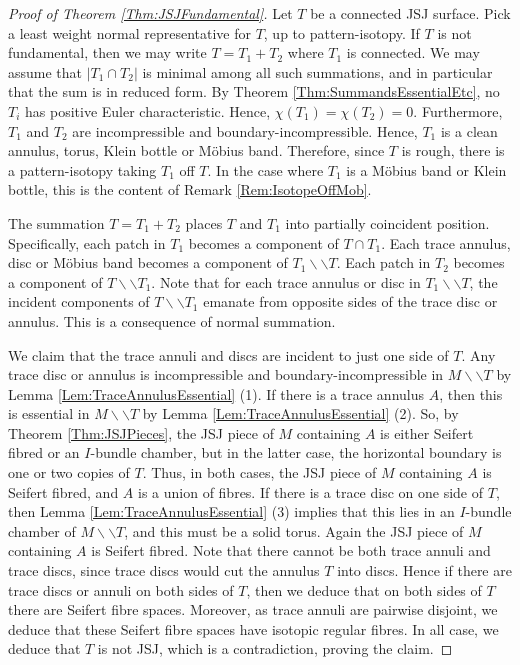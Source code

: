 \documentclass[oneside]{amsart}
\numberwithin{equation}{section}
\theoremstyle{plain}
\theoremstyle{definition}
\newcommand{\cut}{\backslash\backslash}
\begin{document}
\begin{proof}[Proof of Theorem \ref{Thm:JSJFundamental}]
Let $T$ be a connected JSJ surface. Pick a least weight normal representative for $T$, up to pattern-isotopy. If $T$ is not fundamental, then we may write $T = T_1 + T_2$ where $T_1$ is connected. We may assume that $|T_1 \cap T_2|$ is minimal among all such summations, and in particular that the sum is in reduced form.
By Theorem \ref{Thm:SummandsEssentialEtc}, no $T_i$ has positive Euler characteristic. Hence, $\chi(T_1) = \chi(T_2) = 0$. Furthermore, $T_1$ and $T_2$ are incompressible and boundary-incompressible. Hence, $T_1$ is a clean annulus, torus, Klein bottle or M\"obius band. Therefore, since $T$ is rough, there is a pattern-isotopy taking $T_1$ off $T$. In the case where $T_1$ is a M\"obius band or Klein bottle, this is the content of Remark \ref{Rem:IsotopeOffMob}.

The summation $T = T_1 + T_2$ places $T$ and $T_1$ into partially coincident position. Specifically, each patch in $T_1$ becomes a component of $T \cap T_1$. Each trace annulus, disc or M\"obius band becomes a component of $T_1 \cut T$. Each patch in $T_2$ becomes a component of $T \cut T_1$. Note that for each trace annulus or disc in $T_1 \cut T$, the incident components of $T \cut T_1$ emanate from opposite sides of the trace disc or annulus. This is a consequence of normal summation.

We claim that the trace annuli and discs are incident to just one side of $T$. Any trace disc or annulus is incompressible and boundary-incompressible in $M \cut T$ by Lemma \ref{Lem:TraceAnnulusEssential} (1). If there is a trace annulus $A$, then this is essential in $M \cut T$ by Lemma \ref{Lem:TraceAnnulusEssential} (2). So, by Theorem \ref{Thm:JSJPieces}, the JSJ piece of $M$ containing $A$ is either Seifert fibred or an $I$-bundle chamber, but in the latter case, the horizontal boundary is one or two copies of $T$. Thus, in both cases, the JSJ piece of $M$ containing $A$ is Seifert fibred, and $A$ is a union of fibres. If there is a trace disc on one side of $T$, then Lemma \ref{Lem:TraceAnnulusEssential} (3) implies that this lies in an $I$-bundle chamber of $M \cut T$, and this must be a solid torus. Again the JSJ piece of $M$ containing $A$ is Seifert fibred. Note that there cannot be both trace annuli and trace discs, since trace discs would cut the annulus $T$ into discs. Hence if there are trace discs or annuli on both sides of $T$, then we deduce that on both sides of $T$ there are Seifert fibre spaces. Moreover, as trace annuli are pairwise disjoint, we deduce that these Seifert fibre spaces have isotopic regular fibres. In all case, we deduce that $T$ is not JSJ, which is a contradiction, proving the claim.


\end{proof}
\end{document}
